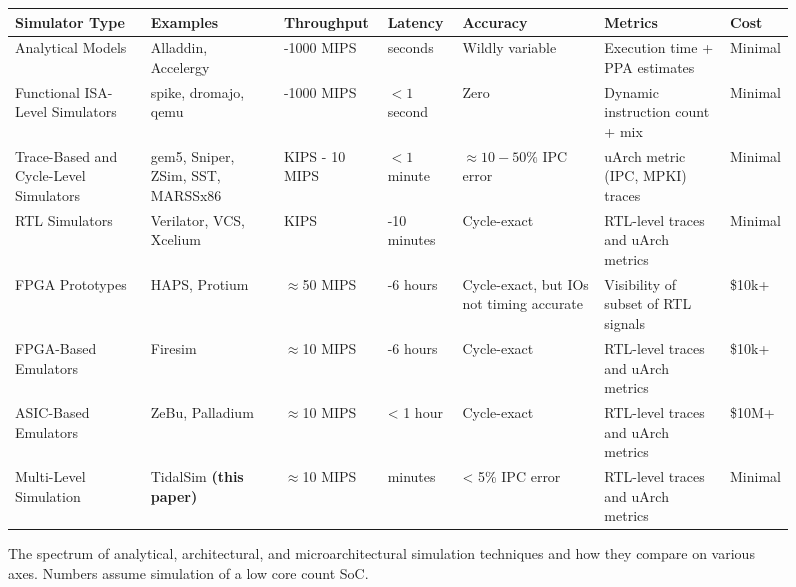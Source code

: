 \documentclass[sigplan,nonacm,10pt]{acmart}
\begin{document}
\begin{figure}[!hbt]
  \small
  \begin{tabular}{>{\raggedright\arraybackslash}p{2.5cm}>{\raggedright\arraybackslash}p{2cm}>{\raggedright\arraybackslash}p{2cm}>{\raggedright\arraybackslash}p{2cm}>{\raggedright\arraybackslash}p{2.5cm}>{\raggedright\arraybackslash}p{3cm}>{\raggedright\arraybackslash}p{2cm}}\toprule
  \textbf{Simulator Type} & \textbf{Examples} & \textbf{Throughput} & \textbf{Latency} & \textbf{Accuracy} & \textbf{Metrics} & \textbf{Cost} \\\midrule
  Analytical Models & Alladdin, Accelergy & 10-1000 MIPS & seconds & Wildly variable & Execution time + PPA estimates & Minimal \\
  \midrule
  Functional ISA-Level Simulators & spike, dromajo, qemu & 100-1000 MIPS & $<1$ second & Zero & Dynamic instruction count + mix & Minimal \\
  \midrule
  Trace-Based and Cycle-Level Simulators & gem5, Sniper, ZSim, SST, MARSSx86 & 100 KIPS - 10 MIPS & $<1$ minute & $\approx10-50\%$ IPC error\cite{x86_arch_sim_study} & uArch metric (IPC, MPKI) traces & Minimal \\
  \midrule
  RTL Simulators & Verilator, VCS, Xcelium & 10 KIPS & 2-10 minutes & Cycle-exact & RTL-level traces and uArch metrics & Minimal \\
  \midrule
  FPGA Prototypes & HAPS, Protium & $\approx$50 MIPS & 2-6 hours & Cycle-exact, but IOs not timing accurate & Visibility of subset of RTL signals & \$10k+ \\
  \midrule
  FPGA-Based Emulators & Firesim & $\approx$10 MIPS & 2-6 hours & Cycle-exact & RTL-level traces and uArch metrics & \$10k+ \\
  \midrule
  ASIC-Based Emulators & ZeBu, Palladium & $\approx$10 MIPS & < 1 hour & Cycle-exact & RTL-level traces and uArch metrics & \$10M+ \\
  \midrule
  Multi-Level Simulation & TidalSim \textbf{(this paper)} & $\approx$10 MIPS & minutes & < 5\% IPC error & RTL-level traces and uArch metrics & Minimal \\
  \bottomrule
  \end{tabular}
  \caption{The spectrum of analytical, architectural, and microarchitectural simulation techniques and how they compare on various axes. Numbers assume simulation of a low core count SoC.}
  \label{fig:spectrum_of_simulators}
\end{figure}
\end{document}
